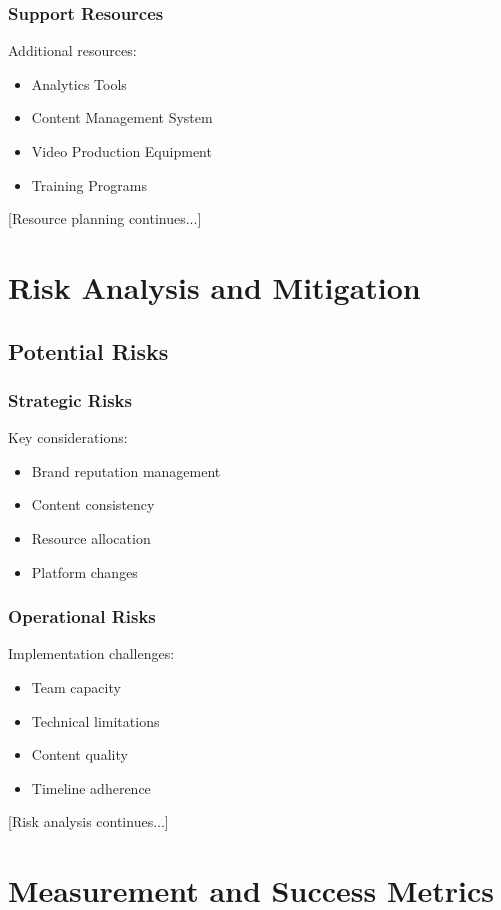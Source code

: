 \documentclass[12pt]{report}
\begin{document}
\subsection{Support Resources}
Additional resources:
\begin{itemize}
    \item Analytics Tools
    \item Content Management System
    \item Video Production Equipment
    \item Training Programs
\end{itemize}

[Resource planning continues...]

\chapter{Risk Analysis and Mitigation}

\section{Potential Risks}
\subsection{Strategic Risks}
Key considerations:
\begin{itemize}
    \item Brand reputation management
    \item Content consistency
    \item Resource allocation
    \item Platform changes
\end{itemize}

\subsection{Operational Risks}
Implementation challenges:
\begin{itemize}
    \item Team capacity
    \item Technical limitations
    \item Content quality
    \item Timeline adherence
\end{itemize}

[Risk analysis continues...]

\chapter{Measurement and Success Metrics}
\end{document}
